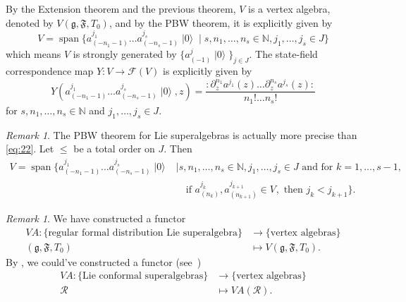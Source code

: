 \documentclass[a4paper, 12pt, reqno]{amsart}
\theoremstyle{remark}
\newtheorem{remark}[theorem]{Remark}
\numberwithin{equation}{subsection}
\DeclareMathOperator{\vspan}{span}
\DeclareMathOperator{\vac}{|0\rangle}
\DeclareMathOperator{\one}{\overline{1}}
\begin{document}
By the Extension theorem and the previous theorem, $V$ is a vertex algebra, denoted by $V(\mathfrak{g}, \mathfrak{F}, T_0)$, and by the PBW theorem, it is explicitly given by
\begin{equation}
  \label{eq:22}
  V = \vspan\{a^{j_1}_{(-n_1 - 1)}\dots a^{j_s}_{(-n_s - 1)}\vac \mid s, n_1, \dots, n_s \in \mathbb{N}, j_1, \dots, j_s \in J\}
\end{equation}
which means $V$ is strongly generated by $\{a^j_{(-1)}\vac\}_{j\in J}$.
The state-field correspondence map $Y: V \to \mathcal{F}(V)$ is explicitly given by
\begin{equation}
  \label{eq:23}
  Y(a^{j_1}_{(-n_1 - 1)}\dots a^{j_s}_{(-n_s - 1)}\vac, z) = \frac{:\partial^{n_1}_za^{j_1}(z)\dots \partial^{n_s}_za^{j_s}(z):}{n_1!\dots n_s!}
\end{equation}
for $s, n_1, \dots, n_s \in \mathbb{N}$ and $j_1, \dots, j_s \in J$.

\begin{remark}
  \label{rmk:12}
  The PBW theorem for Lie superalgebras is actually more precise than \eqref{eq:22}.
  Let $\le$ be a total order on $J$.
  Then
  \begin{equation*}
    \begin{split}
      V = \vspan\{a^{j_1}_{(-n_1 - 1)}\dots a^{j_s}_{(-n_s - 1)}\vac &\mid s, n_1, \dots, n_s \in \mathbb{N}, j_1, \dots, j_s \in J\text{ and for } k = 1, \dots, s - 1,\\
      &\quad \text{if }a^{j_k}_{(n_k)},a^{j_{k + 1}}_{(n_{k + 1})}\in V_{\one},\text{ then }j_k < j_{k + 1}\}.
    \end{split}
  \end{equation*}
\end{remark}

\begin{remark}
  \label{rmk:13}
  We have constructed a functor
  \begin{align*}
    VA: \{\text{regular formal distribution Lie superalgebra}\} &\to \{\text{vertex algebras}\} \\
    (\mathfrak{g}, \mathfrak{F}, T_0) &\mapsto V(\mathfrak{g}, \mathfrak{F}, T_0).
  \end{align*}
  By , we could've constructed a functor (see~\cite[Theorem 2.15]{li_vertex_2004})
  \begin{align*}
    VA: \{\text{Lie conformal superalgebras}\} &\to \{\text{vertex algebras}\} \\
    \mathcal{R} &\mapsto VA(\mathcal{R}).
  \end{align*}
\end{remark}
\end{document}
